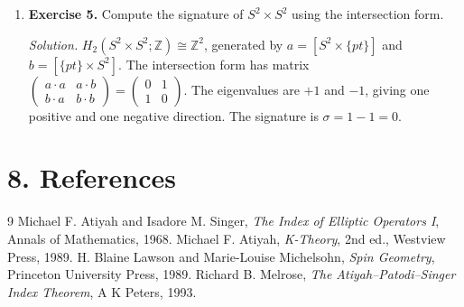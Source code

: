\begin{enumerate}[leftmargin=*,itemsep=0.9em]
\item \textbf{Exercise 5.} Compute the signature of $S^2\times S^2$ using the intersection form.

\emph{Solution.} $H_2(S^2\times S^2;\mathbb{Z})\cong\mathbb{Z}^2$, generated by $a=[S^2\times\{pt\}]$ and $b=[\{pt\}\times S^2]$. The intersection form has matrix $\begin{pmatrix}a\cdot a&a\cdot b\\b\cdot a&b\cdot b\end{pmatrix}=\begin{pmatrix}0&1\\1&0\end{pmatrix}$. The eigenvalues are $+1$ and $-1$, giving one positive and one negative direction. The signature is $\sigma=1-1=0$.

\end{enumerate}
\section*{8. References}

\begin{thebibliography}{9}
 Michael F. Atiyah and Isadore M. Singer, \emph{The Index of Elliptic Operators I}, Annals of Mathematics, 1968.
 Michael F. Atiyah, \emph{K-Theory}, 2nd ed., Westview Press, 1989.
 H. Blaine Lawson and Marie-Louise Michelsohn, \emph{Spin Geometry}, Princeton University Press, 1989.
 Richard B. Melrose, \emph{The Atiyah--Patodi--Singer Index Theorem}, A K Peters, 1993.
\end{thebibliography}
